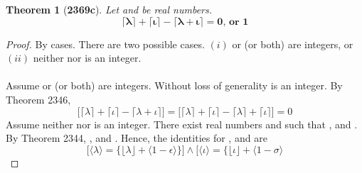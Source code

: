 \documentclass[preview]{standalone}
\newtheorem*{theorem*}{Theorem}
\begin{document}
\begin{theorem*}[\textbf{2369c}]
    Let \bm{$\lambda$} and \bm{$\iota$} be real numbers. 
    \begin{equation*}
        \bm{
            \lceil \lambda \rceil 
                + 
            \lceil \iota \rceil 
                - 
            \lceil \lambda + \iota \rceil 
                = 
            0
                \textbf{, or } 
            1
        }
    \end{equation*}
\end{theorem*}

\begin{proof}
    By cases. 
    There are two possible cases. 
    $(i)$ \bm{$\lambda$} or \bm{$\iota$} (or both) are integers, 
    or $(ii)$ neither \bm{$\lambda$} nor \bm{$\iota$} is an integer.
    \\ \\
     Assume \bm{$\lambda$} or \bm{$\iota$} (or both) are integers. 
    Without loss of generality \bm{$\iota$} is an integer.
    By Theorem 2346, 
    \begin{equation*}
        \Big[ 
            \lceil \lambda \rceil 
                + 
            \lceil \iota \rceil 
                - 
            \lceil \lambda + \iota \rceil 
        \Big]
            = 
        \Big[ 
            \lceil \lambda \rceil 
                + 
            \lceil \iota \rceil 
                - 
            \lceil \lambda \rceil 
                + 
            \lceil \iota \rceil 
        \Big]
            = 
        0
    \end{equation*}
     Assume neither \bm{$\lambda$} nor \bm{$\iota$} is an integer. 
    There exist real numbers \bm{$\epsilon$} and \bm{$\sigma$} such that 
    \bm{$\lceil \lambda \rceil - \lambda = \epsilon$},
    and \bm{$\lceil \iota \rceil - \iota = \sigma$}. 
    By Theorem 2344, 
    , 
    and . 
    Hence, the identities for \bm{$\lambda$}, and \bm{$\iota$} are
    \begin{equation*}
        \bigg[
            \Big \langle \lambda \Big \rangle 
                = 
            \Big\{ 
                \lfloor \lambda \rfloor + \big \langle 1 - \epsilon \big \rangle 
            \Big\}
        \bigg]
            \land
        \bigg[ 
            \Big \langle \iota \Big \rangle 
                = 
            \Big\{ 
                \lfloor \iota \rfloor + \big \langle 1 - \sigma \big \rangle

\end{equation*}
\end{proof}
\end{document}
